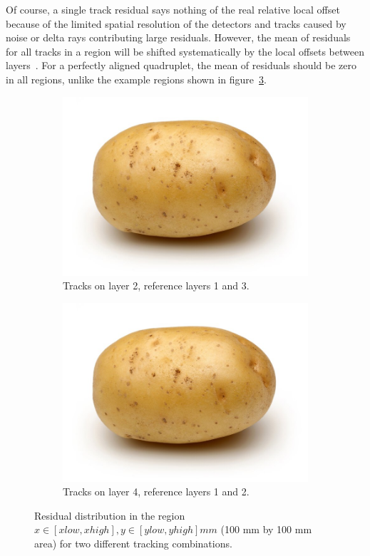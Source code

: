 Of course, a single track residual says nothing of the real relative local offset because of the limited spatial resolution of the detectors and tracks caused by noise or delta rays contributing large residuals. However, the mean of residuals for all tracks in a region will be shifted systematically by the local offsets between layers~\cite{lefebvre_thesis}. For a perfectly aligned quadruplet, the mean of residuals should be zero in all regions, unlike the example regions shown in figure~\ref{fig:res_dist}.

\begin{figure}
\centering
\begin{subfigure}{.5\textwidth}
  \centering
  \includegraphics[width=\linewidth]{figures/potato.jpg}
  \caption{Tracks on layer 2, reference layers 1 and 3.}
  \label{fig:res_dist_L2_F13}
\end{subfigure}%
\begin{subfigure}{.5\textwidth}
  \centering
  \includegraphics[width=\linewidth]{figures/potato.jpg}
  \caption{Tracks on layer 4, reference layers 1 and 2.}
  \label{fig:res_dist_L4_F12}
\end{subfigure}
\caption{Residual distribution in the region $x\in\left[xlow, xhigh\right],  y\in\left[ylow, yhigh\right] mm$ (100 mm by 100 mm area) for two different tracking combinations. }
\label{fig:res_dist}
\end{figure}

